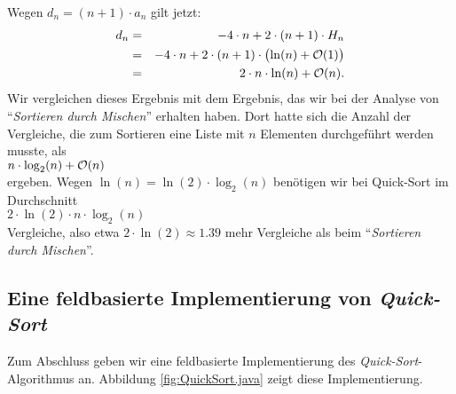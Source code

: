 Wegen $d_n = (n+1) \cdot a_{n}$ gilt jetzt: 
\begin{eqnarray*}  
 d_n & = & -4 \cdot n + 2 \cdot(n+1) \cdot H_n \\
     & = & -4 \cdot n + 2 \cdot(n+1) \cdot \bigl(\ln(n) + \mathcal{O}(1)\bigr) \\
     & = & 2 \cdot n \cdot \ln(n) + \mathcal{O}(n).
\end{eqnarray*}
Wir vergleichen dieses Ergebnis mit dem Ergebnis, das wir bei der Analyse von
``\emph{Sortieren durch Mischen}'' erhalten haben.  Dort hatte sich die Anzahl
der Vergleiche, die zum Sortieren eine Liste mit $n$ Elementen durchgef\"uhrt
werden musste,
als \\[0.2cm]
\hspace*{1.3cm} $n \cdot \log_2(n) + \mathcal{O}(n)$ \\[0.2cm]
ergeben.  Wegen $\ln(n) = \ln(2) \cdot \log_2(n)$ ben\"otigen wir bei Quick-Sort im Durchschnitt \\[0.2cm]
\hspace*{1.3cm} $2 \cdot \ln(2) \cdot n \cdot \log_2(n)$ \\[0.2cm]
Vergleiche, also etwa $2 \cdot \ln(2) \approx 1.39$ mehr Vergleiche als beim
``\emph{Sortieren durch Mischen}''.

\subsection{Eine feldbasierte Implementierung von \emph{Quick-Sort}}
Zum Abschluss geben wir eine feldbasierte Implementierung des \emph{Quick-Sort}-Algorithmus
an.  Abbildung \ref{fig:QuickSort.java} zeigt diese Implementierung.

